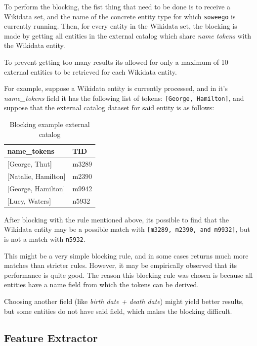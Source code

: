 \documentclass[epsfig,a4paper,11pt,titlepage,twoside,openany]{book}
\begin{document}
To perform the blocking, the fist thing that need to be done is to receive a Wikidata set, and the name of the concrete entity type for which \texttt{soweego} is currently running. Then, for every entity in the Wikidata set, the blocking is made by getting all entities in the external catalog which share \textit{name tokens} with the Wikidata entity. 


To prevent getting too many results its allowed for only a maximum of 10 external entities to be retrieved for each Wikidata entity.

For example, suppose a Wikidata entity is  currently processed, and in it's \textit{name\_tokens} field it has the following list of tokens: \texttt{[George, Hamilton]}, and suppose that the external catalog dataset for said entity is as follows:

\begin{table}[H]
\centering
\begin{tabular}{l|l}
name\_tokens        & TID   \\ \hline
{[George, Thut]}      & m3289 \\
{[Natalie, Hamilton]} & m2390 \\
{[George, Hamilton]}  & m9942 \\
{[Lucy, Waters]}      & n5932
\end{tabular}
\caption{Blocking example external catalog}
\label{tab:soweego-blocking-ex}
\end{table}

After blocking with the rule mentioned above, its possible to find that the Wikidata entity may be a possible match with \texttt{[m3289, m2390, and m9932]}, but is not a match with \texttt{n5932}.

This might be a very simple blocking rule, and in some cases returns much more matches than stricter rules. However, it may be empirically observed that its performance is quite good. The reason this blocking rule was chosen is because all entities have a name field from which the tokens can be derived. 


Choosing another field (like \textit{birth date + death date}) might yield better results, but some entities do not have said field, which makes the blocking difficult. 


\subsection{Feature Extractor}
\label{sec:soweego-st-feature-ext}
\end{document}
